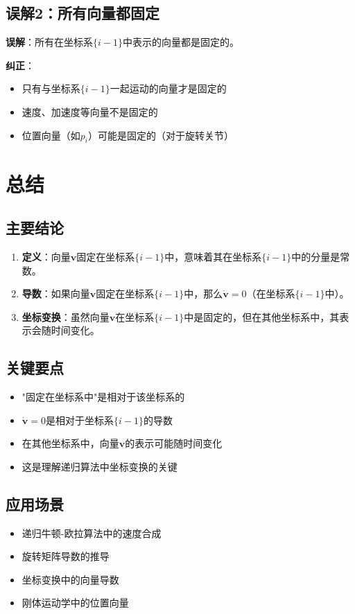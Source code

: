 \documentclass[12pt,a4paper]{article}
\begin{document}
\subsection{误解2：所有向量都固定}

\textbf{误解}：所有在坐标系$\{i-1\}$中表示的向量都是固定的。

\textbf{纠正}：
\begin{itemize}
\item 只有与坐标系$\{i-1\}$一起运动的向量才是固定的
\item 速度、加速度等向量不是固定的
\item 位置向量（如$p_i$）可能是固定的（对于旋转关节）
\end{itemize}

\section{总结}

\subsection{主要结论}

\begin{enumerate}
\item \textbf{定义}：向量$\mathbf{v}$固定在坐标系$\{i-1\}$中，意味着其在坐标系$\{i-1\}$中的分量是常数。

\item \textbf{导数}：如果向量$\mathbf{v}$固定在坐标系$\{i-1\}$中，那么$\dot{\mathbf{v}} = 0$（在坐标系$\{i-1\}$中）。

\item \textbf{坐标变换}：虽然向量$\mathbf{v}$在坐标系$\{i-1\}$中是固定的，但在其他坐标系中，其表示会随时间变化。
\end{enumerate}

\subsection{关键要点}

\begin{itemize}
\item "固定在坐标系中"是相对于该坐标系的
\item $\dot{\mathbf{v}} = 0$是相对于坐标系$\{i-1\}$的导数
\item 在其他坐标系中，向量$\mathbf{v}$的表示可能随时间变化
\item 这是理解递归算法中坐标变换的关键
\end{itemize}

\subsection{应用场景}

\begin{itemize}
\item 递归牛顿-欧拉算法中的速度合成
\item 旋转矩阵导数的推导
\item 坐标变换中的向量导数
\item 刚体运动学中的位置向量
\end{itemize}
\end{document}
